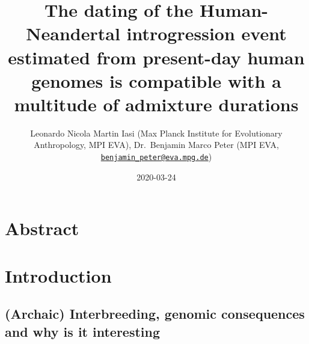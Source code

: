 \documentclass[]{article}
\title{The dating of the Human-Neandertal introgression event estimated from present-day human genomes is compatible with a multitude of admixture durations}
\author{Leonardo Nicola Martin Iasi (Max Planck Institute for Evolutionary
Anthropology, MPI EVA), Dr.~Benjamin Marco Peter (MPI EVA,
\href{mailto:benjamin_peter@eva.mpg.de}{\nolinkurl{benjamin\_peter@eva.mpg.de}})}
\date{2020-03-24}
\begin{document}
\maketitle

\section{Abstract}\label{abstract}

\section{Introduction}\label{introduction}

\subsection{(Archaic) Interbreeding, genomic consequences and why is it interesting}\label{(Archaic) Interbreeding, genomic consequences and why is it interesting}
\end{document}
